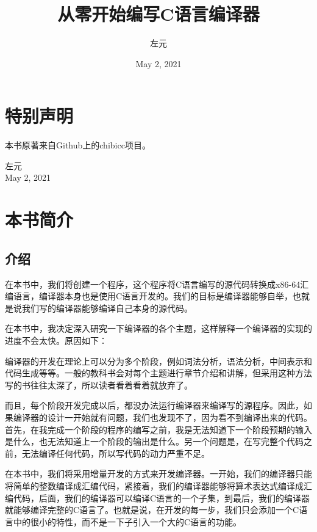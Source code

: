 \documentclass[cn,10pt,math=newtx,citestyle=gb7714-2015,bibstyle=gb7714-2015]{elegantbook}
\title{从零开始编写C语言编译器}
\author{左元}
\date{May 2, 2021}
\begin{document}
\maketitle
\frontmatter

\chapter*{特别声明}


本书原著来自Github上的chibicc项目。

\begin{flushright}
左元 \\
May 2, 2021
\end{flushright}

\tableofcontents

\mainmatter

\chapter{本书简介}

\section{介绍}

在本书中，我们将创建一个程序，这个程序将C语言编写的源代码转换成x86-64汇编语言，编译器本身也是使用C语言开发的。我们的目标是编译器能够自举，也就是说我们写的编译器能够编译自己本身的源代码。

在本书中，我决定深入研究一下编译器的各个主题，这样解释一个编译器的实现的进度不会太快。原因如下：

编译器的开发在理论上可以分为多个阶段，例如词法分析，语法分析，中间表示和代码生成等等。一般的教科书会对每个主题进行章节介绍和讲解，但采用这种方法写的书往往太深了，所以读者看着看着就放弃了。

而且，每个阶段开发完成以后，都没办法运行编译器来编译写的源程序。因此，如果编译器的设计一开始就有问题，我们也发现不了，因为看不到编译出来的代码。首先，在我完成一个阶段的程序的编写之前，我是无法知道下一个阶段预期的输入是什么，也无法知道上一个阶段的输出是什么。另一个问题是，在写完整个代码之前，无法编译任何代码，所以写代码的动力严重不足。

在本书中，我们将采用增量开发的方式来开发编译器。一开始，我们的编译器只能将简单的整数编译成汇编代码，紧接着，我们的编译器能够将算术表达式编译成汇编代码，后面，我们的编译器可以编译C语言的一个子集，到最后，我们的编译器就能够编译完整的C语言了。也就是说，在开发的每一步，我们只会添加一个C语言中的很小的特性，而不是一下子引入一个大的C语言的功能。
\end{document}

